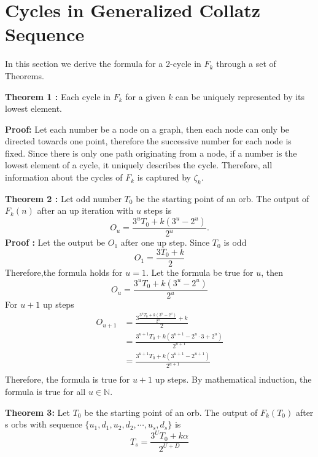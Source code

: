 \documentclass[12pt]{article} %
\begin{document}
\section{Cycles in Generalized Collatz Sequence}

In this section we derive the formula for a 2-cycle in $F_k$ through a set of Theorems.
\newline

\textbf{Theorem 1 :} Each cycle in $F_k$ for a given $k$ can be uniquely represented by its lowest element.

\textbf{Proof:} Let each number be a node on a graph, then each node can only be directed towards one point, therefore the successive number for each node is fixed. Since there is only one path originating from a node, if a number is the lowest element of a cycle, it uniquely describes the cycle.
Therefore, all information about the cycles of $F_k$ is captured by $\zeta_k$.
\newline

\textbf{Theorem 2 :} Let odd number $T_0$ be the starting point of an orb. The output of $F_k(n)$ after an up iteration with $u$ steps is 
\begin{equation*}
O_u = \frac{3^{u}T_0 +k(3^{u}-2^{u})}{2^{u}}.
\end{equation*}
\textbf{Proof :} Let the output be $O_1$ after one up step. Since $T_0$ is odd
\begin{equation*}
O_1 = \frac{3 T_0 + k}{2}
\end{equation*}
Therefore,the formula holds for $u=1$. Let the formula be true for $u$, then
\begin{equation*}
O_u=\frac{3^{u}T_0 +k(3^{u}-2^{u})}{2^{u}}
\end{equation*}
For $u+1$ up steps
\begin{align*}
O_{u+1} &=\frac{3\frac{3^{u}T_0 +k(3^{u}-2^{u})}{2^{u}}+k}{2}\\
&= \frac{3^{u+1}T_0 +k(3^{u+1}-2^{u}\cdot3+2^{u})}{2^{u+1}}\\
&=\frac{3^{u+1}T_0 +k(3^{u+1}-2^{u+1})}{2^{u+1}}\\
\end{align*}
Therefore, the formula is true for $u+1$ up steps. By mathematical induction, the formula is true for all $u \in \mathbb{N}$.
\newline

\textbf{Theorem 3:}
Let $T_0$ be the starting point of an orb. The output of $F_k(T_0)$ after s orbs with sequence $\{u_1, d_1, u_2, d_2, \cdots, u_s, d_s\}$ is
\begin{equation}
T_s = \frac{3^{U}T_0 + k\alpha}{2^{U+D}}
\label{eq:patheq}
\end{equation}
\end{document}
